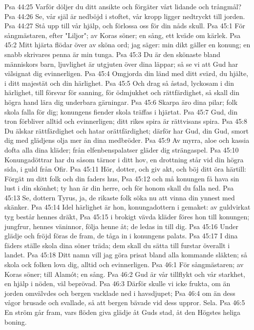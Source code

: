 Psa 44:25  Varför döljer du ditt ansikte och förgäter vårt lidande och trångmål?
Psa 44:26  Se, vår själ är nedböjd i stoftet, vår kropp ligger nedtryckt till jorden.
Psa 44:27  Stå upp till vår hjälp, och förlossa oss för din nåds skull.
Psa 45:1  För sångmästaren, efter "Liljor"; av Koras söner; en sång, ett kväde om kärlek.
Psa 45:2  Mitt hjärta flödar över av sköna ord; jag säger: min dikt gäller en konung; en snabb skrivares penna är min tunga.
Psa 45:3  Du är den skönaste bland människors barn, ljuvlighet är utgjuten över dina läppar; så se vi att Gud har välsignat dig evinnerligen.
Psa 45:4  Omgjorda din länd med ditt svärd, du hjälte, i ditt majestät och din härlighet.
Psa 45:5  Och drag så åstad, lyckosam i din härlighet, till försvar för sanning, för ödmjukhet och rättfärdighet, så skall din högra hand lära dig underbara gärningar.
Psa 45:6  Skarpa äro dina pilar; folk skola falla för dig; konungens fiender skola träffas i hjärtat.
Psa 45:7  Gud, din tron förbliver alltid och evinnerligen; ditt rikes spira är rättvisans spira.
Psa 45:8  Du älskar rättfärdighet och hatar orättfärdighet; därför har Gud, din Gud, smort dig med glädjens olja mer än dina medbröder.
Psa 45:9  Av myrra, aloe och kassia dofta alla dina kläder; från elfenbenspalatser gläder dig strängaspel.
Psa 45:10  Konungadöttrar har du såsom tärnor i ditt hov, en drottning står vid din högra sida, i guld från Ofir.
Psa 45:11  Hör, dotter, och giv akt, och böj ditt öra härtill: Förgät nu ditt folk och din faders hus,
Psa 45:12  och må konungen få hava sin lust i din skönhet; ty han är din herre, och för honom skall du falla ned.
Psa 45:13  Se, dottern Tyrus, ja, de rikaste folk söka nu att vinna din ynnest med skänker.
Psa 45:14  Idel härlighet är hon, konungadottern i gemaket: av guldvirkat tyg består hennes dräkt,
Psa 45:15  i brokigt vävda kläder föres hon till konungen; jungfrur, hennes väninnor, följa henne åt; de ledas in till dig.
Psa 45:16  Under glädje och fröjd föras de fram, de tåga in i konungens palats.
Psa 45:17  I dina fäders ställe skola dina söner träda; dem skall du sätta till furstar överallt i landet.
Psa 45:18  Ditt namn vill jag göra prisat bland alla kommande släkten; så skola ock folken lova dig, alltid och evinnerligen.
Psa 46:1  För sångmästaren; av Koras söner; till Alamót; en sång.
Psa 46:2  Gud är vår tillflykt och vår starkhet, en hjälp i nöden, väl beprövad.
Psa 46:3  Därför skulle vi icke frukta, om än jorden omvälvdes och bergen vacklade ned i havsdjupet;
Psa 46:4  om än dess vågor brusade och svallade, så att bergen bävade vid dess uppror. Sela.
Psa 46:5  En ström går fram, vars flöden giva glädje åt Guds stad, åt den Högstes heliga boning.
